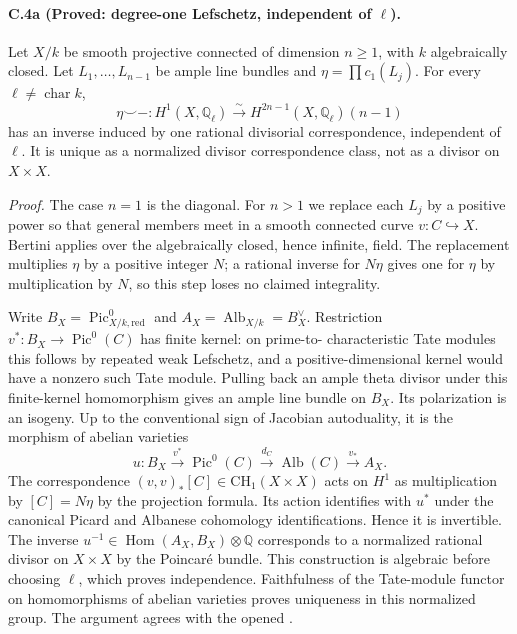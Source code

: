 \paragraph{C.4a (Proved: degree-one Lefschetz, independent of $\ell$).}
Let $X/k$ be smooth projective connected of dimension $n\ge1$, with
$k$ algebraically closed. Let $L_1,\ldots,L_{n-1}$ be ample line bundles
and $\eta=\prod c_1(L_j)$. For every $\ell\ne\operatorname{char}k$,
\begin{equation}\label{eq:degree-one-lefschetz}
 \eta\smile-:H^1(X,\mathbb Q_\ell)\xrightarrow{\sim}
 H^{2n-1}(X,\mathbb Q_\ell)(n-1)
\end{equation}
has an inverse induced by one rational divisorial correspondence,
independent of $\ell$. It is unique as a normalized divisor
correspondence class, not as a divisor on $X\times X$.

\emph{Proof.}
The case $n=1$ is the diagonal. For $n>1$ we replace each $L_j$ by a
positive power so that general members meet in a smooth connected
curve $v:C\hookrightarrow X$. Bertini applies over the algebraically
closed, hence infinite, field. The replacement multiplies $\eta$ by
a positive integer $N$; a rational inverse for $N\eta$ gives one for
$\eta$ by multiplication by $N$, so this step loses no claimed
integrality.

Write $B_X=\operatorname{Pic}^0_{X/k,\mathrm{red}}$ and
$A_X=\operatorname{Alb}_{X/k}=B_X^\vee$. Restriction
$v^*:B_X\to\operatorname{Pic}^0(C)$ has finite kernel: on prime-to-
characteristic Tate modules this follows by repeated weak Lefschetz,
and a positive-dimensional kernel would have a nonzero such Tate
module. Pulling back an ample theta divisor under this finite-kernel
homomorphism gives an ample line bundle on $B_X$. Its polarization is
an isogeny. Up to the conventional sign of Jacobian autoduality, it is
the morphism of abelian varieties
\[
 u:B_X\xrightarrow{v^*}\operatorname{Pic}^0(C)
 \xrightarrow{d_C}\operatorname{Alb}(C)
 \xrightarrow{v_*}A_X.
\]
The correspondence $(v,v)_*[C]\in\mathrm{CH}_1(X\times X)$ acts on
$H^1$ as multiplication by $[C]=N\eta$ by the projection formula.
Its action identifies with $u^*$ under the canonical Picard and
Albanese cohomology identifications. Hence it is invertible. The inverse
$u^{-1}\in\operatorname{Hom}(A_X,B_X)\otimes\mathbb Q$ corresponds to
a normalized rational divisor on $X\times X$ by the Poincar\'e bundle.
This construction is algebraic before choosing $\ell$, which proves
independence. Faithfulness of the Tate-module functor on homomorphisms
of abelian varieties proves uniqueness in this normalized group.
The argument agrees with the opened
\citet[Appendix, Theorem 2A9(5)--(6)]{cyKleiman1968}.

